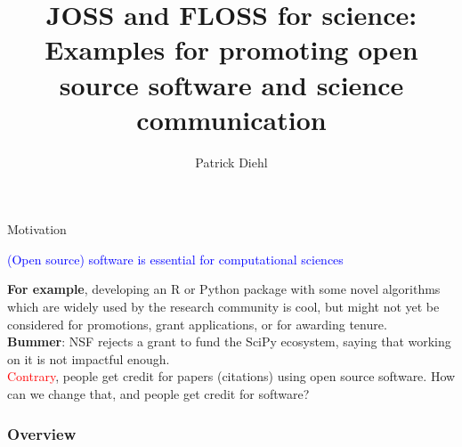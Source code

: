 \documentclass{beamer}
\title[JOSS and FLOSS]{JOSS and FLOSS for science: Examples for promoting open source software and science communication} %
\author{Patrick Diehl}
\begin{document}
\begin{frame}
\titlepage
\end{frame}

\begin{frame}{Motivation}

\begin{center}
    \textcolor{blue}{(Open source) software is essential for computational sciences}
\end{center}

\textbf{For example}, developing an R or Python package with some novel algorithms which are widely used by the research community is cool, but might not yet be considered for promotions, grant applications, or for awarding tenure. \\
\vspace{0.25cm}
\textbf{Bummer}: NSF rejects a grant to fund the SciPy ecosystem, saying that working on it is not impactful enough. \\
\vspace{0.25cm}
\textcolor{red}{Contrary}, people get credit for papers (citations) using open source software. How can we change that, and people get credit for software?  
\end{frame}

\begin{frame}
\frametitle{Overview} %
\tableofcontents %
\end{frame}




\end{document}
